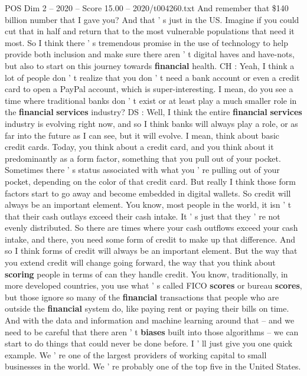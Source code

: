 \begin{textsample}{POS Dim 2 – 2020 – Score 15.00 – 2020/t004260.txt}
And remember that \$140 billion number that I gave you?
And that ' s just in the US.
Imagine if you could cut that in half and return that to the most vulnerable populations that need it most.
So I think there ' s tremendous promise in the use of technology to help provide both inclusion and make sure there aren ' t digital haves and have-nots, but also to start on this journey towards \textbf{financial} health.
CH : Yeah, I think a lot of people don ' t realize that you don ' t need a bank account or even a credit card to open a PayPal account, which is super-interesting.
I mean, do you see a time where traditional banks don ' t exist or at least play a much smaller role in the \textbf{financial} \textbf{services} industry?
DS : Well, I think the entire \textbf{financial} \textbf{services} industry is evolving right now, and so I think banks will always play a role, or as far into the future as I can see, but it will evolve.
I mean, think about basic credit cards.
Today, you think about a credit card, and you think about it predominantly as a form factor, something that you pull out of your pocket.
Sometimes there ' s status associated with what you ' re pulling out of your pocket, depending on the color of that credit card.
But really I think those form factors start to go away and become embedded in digital wallets.
So credit will always be an important element.
You know, most people in the world, it isn ' t that their cash outlays exceed their cash intake.
It ' s just that they ' re not evenly distributed.
So there are times where your cash outflows exceed your cash intake, and there, you need some form of credit to make up that difference.
And so I think forms of credit will always be an important element.
But the way that you extend credit will change going forward, the way that you think about \textbf{scoring} people in terms of can they handle credit.
You know, traditionally, in more developed countries, you use what ' s called FICO \textbf{scores} or bureau \textbf{scores}, but those ignore so many of the \textbf{financial} transactions that people who are outside the \textbf{financial} system do, like paying rent or paying their bills on time.
And with the data and information and machine learning around that -- and we need to be careful that there aren ' t \textbf{biases} built into those algorithms -- we can start to do things that could never be done before.
I ' ll just give you one quick example.
We ' re one of the largest providers of working capital to small businesses in the world.
We ' re probably one of the top five in the United States.

\end{textsample}
